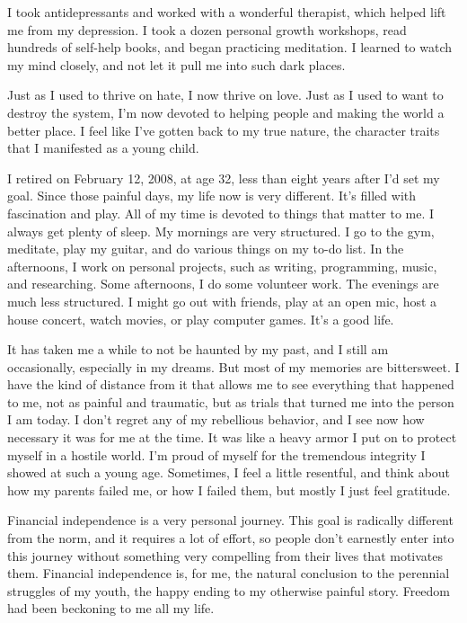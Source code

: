 I took antidepressants and worked with a wonderful therapist, which helped lift me from my depression. I took a dozen personal growth workshops, read hundreds of self-help books, and began practicing meditation. I learned to watch my mind closely, and not let it pull me into such dark places.

Just as I used to thrive on hate, I now thrive on love. Just as I used to want to destroy the system, I'm now devoted to helping people and making the world a better place. I feel like I've gotten back to my true nature, the character traits that I manifested as a young child.

I retired on February 12, 2008, at age 32, less than eight years after I'd set my goal. Since those painful days, my life now is very different. It's filled with fascination and play. All of my time is devoted to things that matter to me. I always get plenty of sleep. My mornings are very structured. I go to the gym, meditate, play my guitar, and do various things on my to-do list. In the afternoons, I work on personal projects, such as writing, programming, music, and researching. Some afternoons, I do some volunteer work. The evenings are much less structured. I might go out with friends, play at an open mic, host a house concert, watch movies, or play computer games. It's a good life.

It has taken me a while to not be haunted by my past, and I still am occasionally, especially in my dreams. But most of my memories are bittersweet. I have the kind of distance from it that allows me to see everything that happened to me, not as painful and traumatic, but as trials that turned me into the person I am today. I don't regret any of my rebellious behavior, and I see now how necessary it was for me at the time. It was like a heavy armor I put on to protect myself in a hostile world. I'm proud of myself for the tremendous integrity I showed at such a young age. Sometimes, I feel a little resentful, and think about how my parents failed me, or how I failed them, but mostly I just feel gratitude.

Financial independence is a very personal journey. This goal is radically different from the norm, and it requires a lot of effort, so people don't earnestly enter into this journey without something very compelling from their lives that motivates them. Financial independence is, for me, the natural conclusion to the perennial struggles of my youth, the happy ending to my otherwise painful story. Freedom had been beckoning to me all my life.
